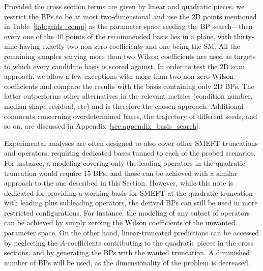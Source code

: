 Provided the cross section terms are given by linear and quadratic pieces, we restrict the BPs to be at most two-dimensional and use the 2D points mentioned in Table~\ref{tab:grids_comp} as the parameter space seeding the BP search---then every one of the $40$ points of the recommended basis lies in a plane, with thirty-nine having exactly two non-zero coefficients and one being the SM. All the remaining samples varying more than two Wilson coefficients are used as targets to which every candidate basis is scored against. In order to test the 2D scan approach, we allow a few exceptions with more than two non-zero Wilson coefficients and compare the results with the basis containing only 2D BPs. The latter outperforms other alternatives in the relevant metrics (condition number, median shape residual, etc) and is therefore the chosen approach. Additional comments concerning overdetermined bases, the trajectory of different seeds, and so on, are discussed in Appendix~\ref{sec:appendix_basis_search}.

Experimental analyses are often designed to also cover other SMEFT truncations and operators, requiring dedicated bases tunned to each of the probed scenarios. For instance, a modeling covering only the leading operators in the quadratic truncation would require 15 BPs, and those can be achieved with a similar approach to the one described in this Section. However, while this note is dedicated for providing a working basis for SMEFT at the quadratic truncation with leading plus subleading operators, the derived BPs can still be used in more restricted configurations. For instance, the modeling of any subset of operators can be achieved by simply zeroing the Wilson coefficients of the unwanted parameter space. On the other hand, linear-truncated predictions can be accessed by neglecting the $A$-coefficients contributing to the quadratic pieces in the cross sections, and by generating the BPs with the wanted truncation. A diminished number of BPs will be used, as the dimensionality of the problem is decreased. 







